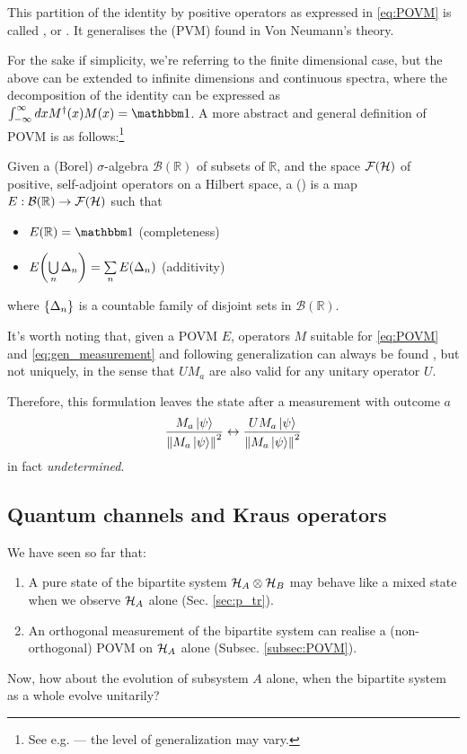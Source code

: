 This partition of the identity by positive operators
as expressed in \eqref{eq:POVM} is called
, or .
It generalises the  (PVM)
found in Von Neumann's theory.

For the sake if simplicity, we're referring to the finite dimensional case,
but the above can be extended to infinite dimensions and continuous spectra,
where the decomposition of the identity can be expressed as
$\int_{-\infty}^{\infty} dx M^{\dagger}(x)M(x) = \idop $.
A more abstract and general definition of POVM is as
follows:\footnote{
  See e.g. \cite{BeneduciPhD, Berberian} --- the level of generalization may vary.
}
\begin{definition}
  Given a (Borel) $\sigma$-algebra $\mathcal{B}(\mathbb{R})$ of subsets of $\mathbb{R}$,
  and the space $\mathcal{F}(\mathcal{H})$ of positive, self-adjoint operators on a Hilbert space,
  a  ()
  is a map $E: \mathcal{B}(\mathbb{R}) \rightarrow \mathcal{F}(\mathcal{H})$
  such that
  \begin{itemize}
    \item $E(\mathbb{R}) = \idop$ (completeness)
    \item $E\qty(\bigcup\limits_{n} \Delta_n) = \sum\limits_{n} E\qty(\Delta_n)$ (additivity) 
  \end{itemize}
  where $\left\{\Delta_n\right\}$ is a countable family of disjoint sets in
  $\mathcal{B}(\mathbb{R})$.
\end{definition}

It's worth noting that,
given a POVM $E$, operators $M$
suitable for \eqref{eq:POVM} and \eqref{eq:gen_measurement}
and following generalization
can always be found \parencite[Sec. 3.1]{PreskillNotes},
but not uniquely, in the sense that
$UM_a$ are also valid
for any unitary operator $U$.

Therefore, this formulation leaves the state after a measurement
with outcome $a$
\[
  \frac{M_a\ket{\psi}}{\norm{M_a\ket{\psi}}^2}
  \leftrightarrow
  \frac{UM_a\ket{\psi}}{\norm{M_a\ket{\psi}}^2}
\]
in fact \emph{undetermined}.

\subsection{Quantum channels and Kraus operators}

We have seen so far that:
\begin{enumerate}
\item
  A pure state of the bipartite system $\mathcal{H}_A\otimes\mathcal{H}_B$
  may behave like a mixed state when we observe $\mathcal{H}_A$ alone
  (Sec. \ref{sec:p_tr}).
\item
  An orthogonal measurement of the bipartite system can realise a
  (non-orthogonal) POVM on $\mathcal{H}_A$ alone (Subsec. \ref{subsec:POVM}).
\end{enumerate}
Now, how about the evolution of subsystem $A$ alone,
when the bipartite system as a whole evolve unitarily?

